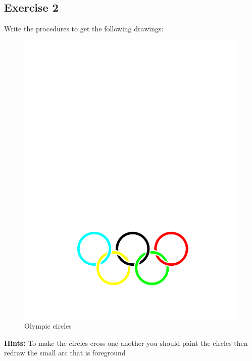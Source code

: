 \documentclass [11pt, twoside]{article}
\begin{document}
\subsection*{Exercise 2}
Write the procedures to get the following drawings:
\vspace{10pt}

\begin{figure}[htbp]
\begin{center}
\includegraphics[scale=0.5]{source/olympicCircles.pdf}
\caption{Olympic circles}
\label{default}
\end{center}
\end{figure}



\textbf{Hints:} To make the circles cross one another you should paint the circles then redraw the small arc that is foreground

\solution{}
\end{document}
